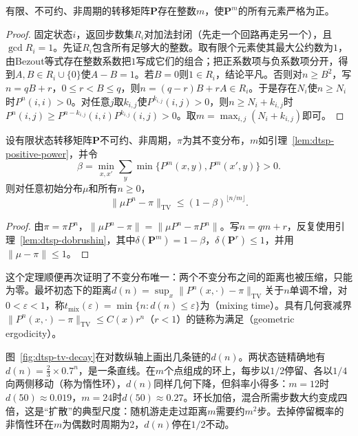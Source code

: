 \begin{lemma}[非周期链的正幂]
  \label{lem:dtsp-positive-power}
  有限、不可约、非周期的转移矩阵$\bm P$存在整数$m$，使$\bm P^m$的所有元素严格为正。
\end{lemma}

\begin{proof}
固定状态$i$，返回步数集$R_i$对加法封闭（先走一个回路再走另一个），且$\gcd R_i=1$。先证$R_i$包含所有足够大的整数。取有限个元素使其最大公约数为$1$，由Bezout等式存在整数系数把$1$写成它们的组合；把正系数项与负系数项分开，得到$A,B\in R_i\cup\{0\}$使$A-B=1$。若$B=0$则$1\in R_i$，结论平凡。否则对$n\geq B^2$，写$n=qB+r$，$0\leq r<B\leq q$，则$n=(q-r)B+rA\in R_i$。于是存在$N_i$使$n\geq N_i$时$P^n(i,i)>0$。对任意$j$取$k_{i,j}$使$P^{k_{i,j}}(i,j)>0$，则$n\geq N_i+k_{i,j}$时$P^n(i,j)\geq P^{n-k_{i,j}}(i,i)P^{k_{i,j}}(i,j)>0$。取$m=\max_{i,j}(N_i+k_{i,j})$即可。
\end{proof}

\begin{theorem}[有限链的几何遍历]
  \label{thm:dtsp-finite-convergence}
  设有限状态转移矩阵$\bm P$不可约、非周期，$\pi$为其不变分布，$m$如引理~\ref{lem:dtsp-positive-power}，并令
  \[
    \beta=\min_{x,x'}\sum_y\min\{P^m(x,y),P^m(x',y)\}>0 .
  \]
  则对任意初始分布$\mu$和所有$n\geq0$，
  \begin{equation}
    \lVert\mu P^n-\pi\rVert_{\mathrm{TV}}\leq(1-\beta)^{\lfloor n/m\rfloor}.
    \label{eq:dtsp-geometric-ergodicity}
  \end{equation}
\end{theorem}

\begin{proof}
由$\pi=\pi P^n$，$\lVert\mu P^n-\pi\rVert=\lVert\mu P^n-\pi P^n\rVert$。写$n=qm+r$，反复使用引理~\ref{lem:dtsp-dobrushin}，其中$\delta(\bm P^m)=1-\beta$，$\delta(\bm P^r)\leq1$，并用$\lVert\mu-\pi\rVert\leq1$。
\end{proof}

这个定理顺便再次证明了不变分布唯一：两个不变分布之间的距离也被压缩，只能为零。最坏初态下的距离$d(n)=\sup_x\lVert P^n(x,\cdot)-\pi\rVert_{\mathrm{TV}}$关于$n$单调不增，对$0<\varepsilon<1$，称$t_{\mathrm{mix}}(\varepsilon)=\min\{n:d(n)\leq\varepsilon\}$为（mixing time）。具有几何衰减界$\lVert P^n(x,\cdot)-\pi\rVert_{\mathrm{TV}}\leq C(x)r^n$（$r<1$）的链称为满足（geometric ergodicity）。

图~\ref{fig:dtsp-tv-decay}在对数纵轴上画出几条链的$d(n)$。两状态链精确地有$d(n)=\frac23\times0.7^n$，是一条直线。在$m$个点组成的环上，每步以$1/2$停留、各以$1/4$向两侧移动（称为惰性环），$d(n)$同样几何下降，但斜率小得多：$m=12$时$d(50)\approx0.019$，$m=24$时$d(50)\approx0.27$。环长加倍，混合所需步数大约变成四倍，这是“扩散”的典型尺度：随机游走走过距离$m$需要约$m^2$步。去掉停留概率的非惰性环在$m$为偶数时周期为$2$，$d(n)$停在$1/2$不动。

